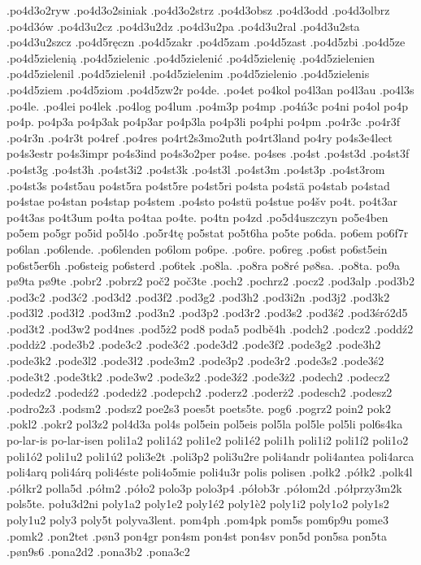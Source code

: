 {{.po4d3o2ryw
.po4d3o2siniak
.po4d3o2strz
.po4d3obsz
.po4d3odd
.po4d3olbrz
.po4d3ów
.po4d3u2cz
.po4d3u2dz
.po4d3u2pa
.po4d3u2ral
.po4d3u2sta
.po4d3u2szcz
.po4d5ręczn
.po4d5zakr
.po4d5zam
.po4d5zast
.po4d5zbi
.po4d5ze
.po4d5zielenią
.po4d5zielenic
.po4d5zielenić
.po4d5zielenię
.po4d5zielenien
.po4d5zielenil
.po4d5zielenił
.po4d5zielenim
.po4d5zielenio
.po4d5zielenis
.po4d5ziem
.po4d5ziom
.po4d5zw2r
po4de.
.po4et
po4kol
po4l3an
po4l3au
.po4l3s
.po4le.
.po4lei
po4lek
.po4log
po4lum
.po4m3p
po4mp
.po4ń3c
po4ni
po4ol
po4p
po4p.
po4p3a
po4p3ak
po4p3ar
po4p3la
po4p3li
po4phi
po4pm
.po4r3c
.po4r3f
.po4r3n
.po4r3t
po4ref
.po4res
po4rt2s3mo2uth
po4rt3land
po4ry
po4s3e4lect
po4s3estr
po4s3impr
po4s3ind
po4s3o2per
po4se.
po4ses
.po4st
.po4st3d
.po4st3f
.po4st3g
.po4st3h
.po4st3i2
.po4st3k
.po4st3l
.po4st3m
.po4st3p
.po4st3rom
.po4st3s
po4st5au
po4st5ra
po4st5re
po4st5ri
po4sta
po4stä
po4stab
po4stad
po4stae
po4stan
po4stap
po4stem
.po4sto
po4stü
po4stue
po4šv
po4t.
po4t3ar
po4t3as
po4t3um
po4ta
po4taa
po4te.
po4tn
po4zd
.po5d4uszczyn
po5e4ben
po5em
po5gr
po5id
po5l4o
.po5r4tę
po5stat
po5t6ha
po5te
po6da.
po6em
po6f7r
po6lan
.po6lende.
.po6lenden
po6lom
po6pe.
.po6re.
po6reg
.po6st
po6st5ein
po6st5er6h
.po6steig
po6sterd
.po6tek
.po8la.
.po8ra
po8ré
pø8sa.
.po8ta.
po9a
pø9ta
pø9te
.pobr2
.pobrz2
poč2
poč3te
.poch2
.pochrz2
.pocz2
.pod3alp
.pod3b2
.pod3c2
.pod3ć2
.pod3d2
.pod3f2
.pod3g2
.pod3h2
.pod3i2n
.pod3j2
.pod3k2
.pod3l2
.pod3ł2
.pod3m2
.pod3n2
.pod3p2
.pod3r2
.pod3s2
.pod3ś2
.pod3śró2d5
.pod3t2
.pod3w2
pod4nes
.pod5ż2
pod8
poda5
podbě4h
.podch2
.podcz2
.poddź2
.poddż2
.pode3b2
.pode3c2
.pode3ć2
.pode3d2
.pode3f2
.pode3g2
.pode3h2
.pode3k2
.pode3l2
.pode3ł2
.pode3m2
.pode3p2
.pode3r2
.pode3s2
.pode3ś2
.pode3t2
.pode3tk2
.pode3w2
.pode3z2
.pode3ź2
.pode3ż2
.podech2
.podecz2
.podedz2
.podedź2
.podedż2
.podepch2
.poderz2
.poderż2
.podesch2
.podesz2
.podro2z3
.podsm2
.podsz2
poe2s3
poes5t
poets5te.
pog6
.pogrz2
poin2
pok2
.pokl2
.pokr2
pol3z2
pol4d3a
pol4s
pol5ein
pol5eis
pol5la
pol5le
pol5li
pol6s4ka
po-lar-is
po-lar-isen
poli1a2
poli1á2
poli1e2
poli1é2
poli1h
poli1i2
poli1í2
poli1o2
poli1ó2
poli1u2
poli1ú2
poli3e2t
.poli3p2
poli3u2re
poli4andr
poli4antea
poli4arca
poli4arq
poli4árq
poli4éste
poli4o5mie
poli4u3r
polis
polisen
.połk2
.półk2
.polk4l
.półkr2
polla5d
.półm2
.póło2
polo3p
polo3p4
.półob3r
.półom2d
.półprzy3m2k
pols5te.
połu3d2ni
poly1a2
poly1e2
poly1é2
poly1è2
poly1i2
poly1o2
poly1s2
poly1u2
poly3
poly5t
polyva3lent.
pom4ph
.pom4pk
pom5s
pom6p9u
pome3
.pomk2
.pon2tet
.pøn3
pon4gr
pon4sm
pon4st
pon4sv
pon5d
pon5sa
pon5ta
.pøn9s6
.pona2d2
.pona3b2
.pona3c2
}}

